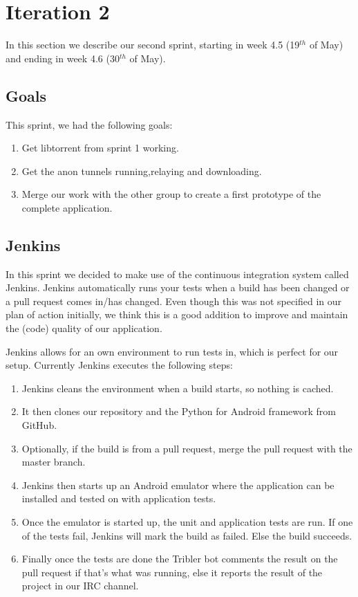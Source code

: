 \section{Iteration 2}
\label{iteration2}
	In this section we describe our second sprint, starting in week 4.5 (19$^{th}$ of May) and ending in week 4.6 (30$^{th}$ of May).

	\subsection{Goals}
		This sprint, we had the following goals:
	
		\begin{enumerate}
			\item Get libtorrent from sprint 1 working.
			\item Get the anon tunnels running,relaying and downloading.
			\item Merge our work with the other group to create a first prototype of the complete application.
		\end{enumerate}
	
	\subsection{Jenkins}
		In this sprint we decided to make use of the continuous integration system called Jenkins. Jenkins automatically runs your tests when a build has been changed or a pull request comes in/has changed. 
		Even though this was not specified in our plan of action initially, we think this is a good addition to improve and maintain the (code) quality of our application.
		
		Jenkins allows for an own environment to run tests in, which is perfect for our setup. Currently Jenkins executes the following steps:
		
		\begin{enumerate}
			\item Jenkins cleans the environment when a build starts, so nothing is cached.
			\item It then clones our repository and the Python for Android framework from GitHub.
			\item Optionally, if the build is from a pull request, merge the pull request with the master branch.
			\item Jenkins then starts up an Android emulator where the application can be installed and tested on with application tests.
			\item Once the emulator is started up, the unit and application tests are run. If one of the tests fail, Jenkins will mark the build as failed. Else the build succeeds.
			\item Finally once the tests are done the Tribler bot comments the result on the pull request if that's what was running, else it reports the result of the project in our IRC channel.
		\end{enumerate} 
		

